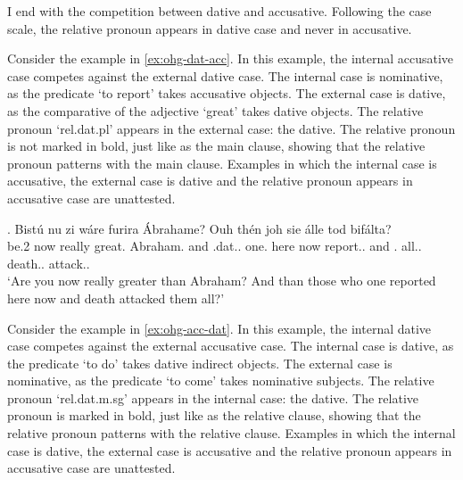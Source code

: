 I end with the competition between dative and accusative. Following the case scale, the relative pronoun appears in dative case and never in accusative.

Consider the example in \ref{ex:ohg-dat-acc}. In this example, the internal accusative case competes against the external dative case.
The internal case is nominative, as the predicate  `to report' takes accusative objects.
The external case is dative, as the comparative of the adjective  `great' takes dative objects.
The relative pronoun  `\ac{rel}.\ac{dat}.\ac{pl}' appears in the external case: the dative. The relative pronoun is not marked in bold, just like as the main clause, showing that the relative pronoun patterns with the main clause.
Examples in which the internal case is accusative, the external case is dative and the relative pronoun appears in accusative case are unattested.

\exg. Bistú nu {zi wáre} furira Ábrahame? Ouh thén     joh sie álle tod bifálta?\\
{be.2 } now really {great}.\scsub{[dat]} Abraham. and .\ac{dat}.. one. here now report..\scsub{[acc]}
and . all.. death.. attack..\\
`Are you now really greater than Abraham? And than those who one reported here now and death attacked them all?' \label{ex:ohg-dat-acc}

Consider the example in \ref{ex:ohg-acc-dat}. In this example, the internal dative case competes against the external accusative case.
The internal case is dative, as the predicate  `to do' takes dative indirect objects.
The external case is nominative, as the predicate  `to come' takes nominative subjects.
The relative pronoun  `\ac{rel}.\ac{dat}.\ac{m}.\ac{sg}' appears in the internal case: the dative. The relative pronoun is marked in bold, just like as the relative clause, showing that the relative pronoun patterns with the relative clause.
Examples in which the internal case is dative, the external case is accusative and the relative pronoun appears in accusative case are unattested.


